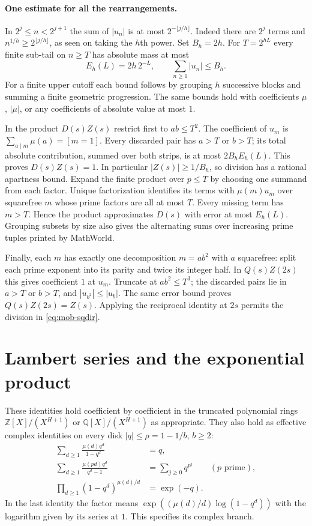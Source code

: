\paragraph{One estimate for all the rearrangements.}
In $2^j\le n<2^{j+1}$ the sum of $|u_n|$ is at most
$2^{-\lfloor j/h\rfloor}$. Indeed there are $2^j$ terms and
$n^{1/h}\ge2^{\lfloor j/h\rfloor}$, as seen on taking the $h$th power.
Set $B_h=2h$. For $T=2^{hL}$ every finite sub-tail on $n\ge T$
has absolute mass at most
\[
 E_h(L)=2h\,2^{-L},\qquad \sum_{n\ge1}|u_n|\le B_h .
\]
For a finite upper cutoff each bound follows by grouping $h$ successive
blocks and summing a finite geometric progression. The same bounds hold
with coefficients $\mu$, $|\mu|$, or any coefficients of absolute value
at most $1$.

In the product $D(s)Z(s)$ restrict first to $ab\le T^2$.
The coefficient of $u_m$ is $\sum_{a\mid m}\mu(a)=[m=1]$.
Every discarded pair has $a>T$ or $b>T$; its total absolute contribution,
summed over both strips, is at most $2B_h E_h(L)$. This proves $D(s)Z(s)=1$.
In particular $|Z(s)|\ge1/B_h$, so division has a rational apartness
bound. Expand the finite product over $p\le T$ by choosing one summand
from each factor. Unique factorization identifies its terms with
$\mu(m)u_m$ over squarefree $m$ whose prime factors are all at most $T$.
Every missing term has $m>T$. Hence the product approximates $D(s)$ with
error at most $E_h(L)$. Grouping subsets by size also gives the
alternating sums over increasing prime tuples printed by MathWorld.

Finally, each $m$ has exactly one decomposition $m=a b^2$ with $a$
squarefree: split each prime exponent into its parity and twice its
integer half. In $Q(s)Z(2s)$ this gives coefficient $1$ at $u_m$.
Truncate at $ab^2\le T^3$; the discarded pairs lie in $a>T$ or $b>T$,
and $|u_{b^2}|\le |u_b|$. The same error bound proves
$Q(s)Z(2s)=Z(s)$. Applying the reciprocal identity at $2s$ permits
the division in \eqref{eq:mob-sqdir}.

\section{Lambert series and the exponential product}
\label{sec:mob-lambert}

These identities hold coefficient by coefficient in the truncated
polynomial rings $\mathbb Z[X]/(X^{H+1})$ or
$\mathbb Q[X]/(X^{H+1})$ as appropriate. They also hold as effective
complex identities on every disk $|q|\le \rho=1-1/b$, $b\ge2$:
\begin{align}
 \sum_{d\ge1}\frac{\mu(d)q^d}{1-q^d}&=q,\label{eq:mob-lam1}\\
 \sum_{d\ge1}\frac{\mu(pd)q^d}{q^d-1}
    &=\sum_{j\ge0}q^{p^j}\qquad(p\text{ prime}),\label{eq:mob-lam2}\\
 \prod_{d\ge1}(1-q^d)^{\mu(d)/d}&=\exp(-q).\label{eq:mob-logprod}
\end{align}
In the last identity the factor means
$\exp((\mu(d)/d)\log(1-q^d))$ with the logarithm given by its series
at $1$. This specifies its complex branch.

